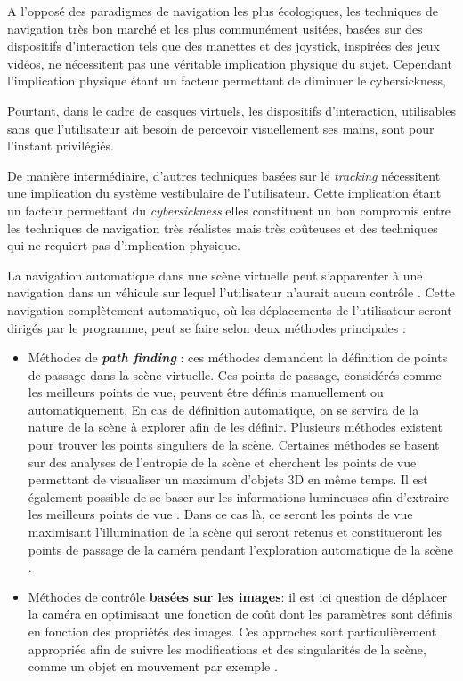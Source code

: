 A l'opposé des paradigmes de navigation les plus écologiques, les techniques de navigation très bon marché et les plus communément usitées, basées sur des dispositifs d'interaction tels que des manettes et des joystick, inspirées des jeux vidéos, ne nécessitent pas une véritable implication physique du sujet. Cependant l'implication physique étant un facteur permettant de diminuer le cybersickness,

Pourtant, dans le cadre de casques virtuels, les dispositifs d'interaction, utilisables sans que l'utilisateur ait besoin de percevoir visuellement ses mains, sont pour l'instant privilégiés. 

De manière intermédiaire, d'autres techniques basées sur le \textit{tracking} nécessitent une implication du système vestibulaire de l'utilisateur. Cette implication étant un facteur permettant du \textit{cybersickness} elles constituent un bon compromis entre les techniques de navigation très réalistes mais très coûteuses et des techniques qui ne requiert pas d'implication physique.


La navigation automatique dans une scène virtuelle peut s'apparenter à une navigation dans un véhicule sur lequel l'utilisateur n'aurait aucun contrôle \cite{habibi20143d}. Cette navigation complètement automatique, où les déplacements de l'utilisateur seront dirigés par le programme, peut se faire selon deux méthodes principales :

\begin{itemize}
  \item Méthodes de \textit{\textbf{path finding}} : ces méthodes demandent la définition de points de passage dans la scène virtuelle. Ces points de passage, considérés comme les meilleurs points de vue, peuvent être définis manuellement ou automatiquement. En cas de définition automatique, on se servira de la nature de la scène à explorer afin de les définir. Plusieurs méthodes existent pour trouver les points singuliers de la scène. Certaines méthodes  se basent sur des analyses de l'entropie de la scène et cherchent les points de vue permettant de visualiser un maximum d'objets 3D en même temps\cite{vazquez2001viewpoint}. Il est également possible de se baser sur les informations lumineuses afin d'extraire les meilleurs points de vue . Dans ce cas là, ce seront les points de vue maximisant l'illumination de la scène qui seront retenus et constitueront les points de passage de la caméra pendant l'exploration automatique de la scène \cite{gumhold2002maximum}.
  \item Méthodes de contrôle \textbf{basées sur les images}: il est ici question de déplacer la caméra en optimisant une fonction de coût dont les paramètres sont définis en fonction des propriétés des images.  Ces approches sont particulièrement appropriée afin de suivre les modifications et des singularités de la scène, comme un objet en mouvement par exemple \cite{courty2001computer}. 
\end{itemize}

